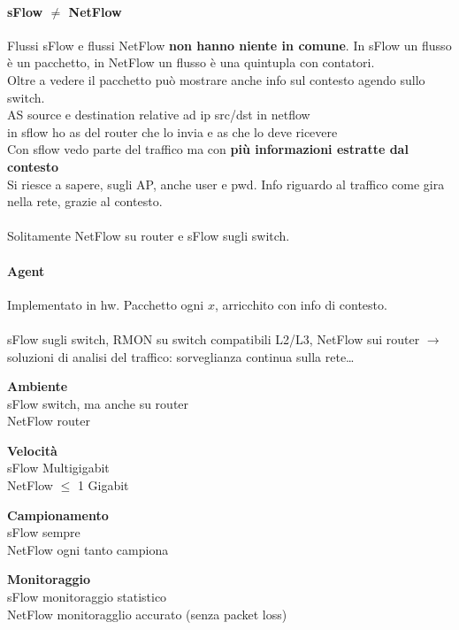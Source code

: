 \documentclass[10pt]{book}
\begin{document}
\paragraph{sFlow $\neq$ NetFlow} Flussi sFlow e flussi NetFlow \textbf{non hanno niente in comune}. In sFlow un flusso è un pacchetto, in NetFlow un flusso è una quintupla con contatori.\\
Oltre a vedere il pacchetto può mostrare anche info sul contesto agendo sullo switch.\\
AS source e destination relative ad ip src/dst in netflow\\
in sflow ho as del router che lo invia e as che lo deve ricevere\\
Con sflow vedo parte del traffico ma con \textbf{più informazioni estratte dal contesto}\\
Si riesce a sapere, sugli AP, anche user e pwd. Info riguardo al traffico come gira nella rete, grazie al contesto.\\\\
Solitamente NetFlow su router e sFlow sugli switch.
\paragraph{Agent} Implementato in hw. Pacchetto ogni $x$, arricchito con info di contesto.\\\\
sFlow sugli switch, RMON su switch compatibili L2/L3, NetFlow sui router $\rightarrow$ soluzioni di analisi del traffico: sorveglianza continua sulla rete\ldots
\begin{multicols}{2}
\begin{list}{}{}
	\item \textbf{Ambiente}\\sFlow switch, ma anche su router\\
	NetFlow router
	\item \textbf{Velocità}\\sFlow Multigigabit\\
	NetFlow $\leq$ 1 Gigabit
	\item \textbf{Campionamento}\\sFlow sempre\\
	NetFlow ogni tanto campiona
	\item \textbf{Monitoraggio}\\sFlow monitoraggio statistico\\
	NetFlow monitoragglio accurato (senza packet loss)
\end{list}
\end{multicols}
\pagebreak
\end{document}
